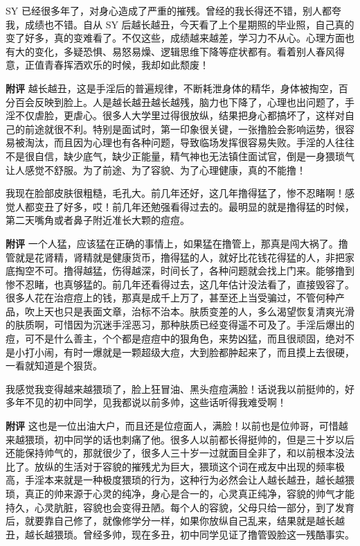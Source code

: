 \begin{case}[变丑]
    SY 已经很多年了，对身心造成了严重的摧残。曾经的我长得还不错，别人都夸我，成绩也不错。自从 SY 后越长越丑，今天看了上个星期照的毕业照，自己真的变了好多，真的变难看了。不仅这些，成绩越来越差，学习力不从心。心理方面也有大的变化，多疑恐惧、易怒易燥、逻辑思维下降等症状都有。看着别人春风得意，正值青春挥洒欢乐的时候，我却如此颓废！

    \textbf{附评} 越长越丑，这是手淫后的普遍规律，不断耗泄身体的精华，身体被掏空，百分百会反映到脸上。人是越长越丑越长越残，脑力也下降了，心理也出问题了，手淫不仅虐脸，更虐心。很多人大学里过得很放纵，结果把身心都搞坏了，这样对自己的前途就很不利。特别是面试时，第一印象很关键，一张撸脸会影响运势，很容易被淘汰，而且因为心理也有各种问题，导致临场发挥很容易失败。手淫的人往往不是很自信，缺少底气，缺少正能量，精气神也无法镇住面试官，倒是一身猥琐气让人感觉不舒服。为了前途、为了容貌、为了心理健康，真的不能撸！
\end{case}

\begin{case}[变丑]
    我现在脸部皮肤很粗糙，毛孔大。前几年还好，这几年撸得猛了，惨不忍睹啊！感觉人都变丑了好多，哎！前几年还勉强看得过去的。最明显的就是撸得猛的时候，第二天嘴角或者鼻子附近准长大颗的痘痘。

    \textbf{附评} 一个人猛，应该猛在正确的事情上，如果猛在撸管上，那真是闯大祸了。撸管就是花肾精，肾精就是健康货币，撸得猛的人，就好比花钱花得猛的人，非把家底掏空不可。撸得越猛，伤得越深，时间长了，各种问题就会找上门来。能够撸到惨不忍睹，也真够猛的。前几年还看得过去，这几年估计没法看了，直接毁容了。很多人花在治痘痘上的钱，那真是成千上万了，甚至还上当受骗过，不管何种产品，吹上天也只是表面文章，治标不治本。肤质变差的人，多么渴望恢复清爽光滑的肤质啊，可惜因为沉迷手淫恶习，那种肤质已经变得遥不可及了。手淫后爆出的痘，可不是什么善主，个个都是痘痘中的狠角色，来势凶猛，而且很顽固，绝对不是小打小闹，有时一爆就是一颗超级大痘，大到脸都肿起来了，而且摸上去很硬，一看就知道是个狠货。
\end{case}

\begin{case}[变丑]
    我感觉我变得越来越猥琐了，脸上狂冒油、黑头痘痘满脸！话说我以前挺帅的，好多年不见的初中同学，见我都说以前多帅，这些话听得我难受啊！

    \textbf{附评} 这也是一位出油大户，而且还是位痘面人，满脸！以前也是位帅哥，可惜越来越猥琐，初中同学的话也刺痛了他。很多人以前都长得挺帅的，但是三十岁以后还能保持帅气的，那就很少了，很多人三十岁一过就面目全非了，和以前根本没法比了。放纵的生活对于容貌的摧残尤为巨大，猥琐这个词在戒友中出现的频率极高，手淫本来就是一种极度猥琐的行为，这种行为必然会让人越长越丑，越长越猥琐，真正的帅来源于心灵的纯净，身心是合一的，心灵真正纯净，容貌的帅气才能持久，心灵肮脏，容貌也会变得丑陋。每个人的容貌，父母只给一部分，到了发育后，就要靠自己修了，就像修学分一样，如果你放纵自己乱来，结果就是越长越丑，越长越猥琐。曾经多帅，现在多丑，初中同学见证了撸管毁脸这一残酷事实。
\end{case}

